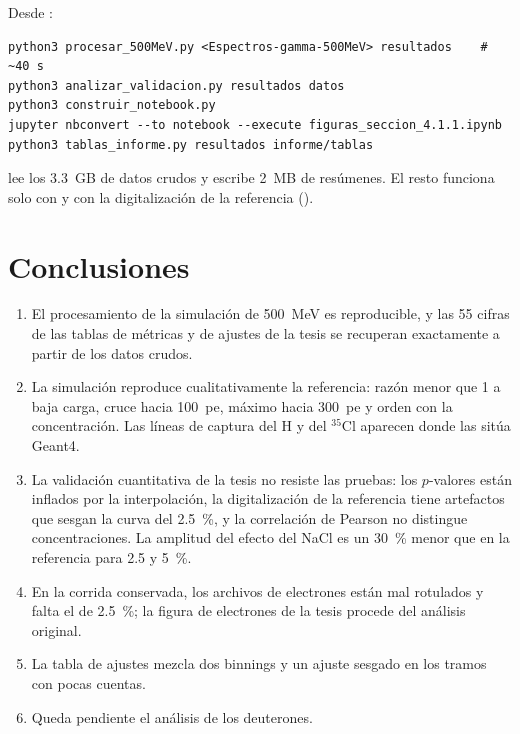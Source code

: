 \documentclass[11pt,a4paper]{article}
\begin{document}
Desde :
\begin{lstlisting}
python3 procesar_500MeV.py <Espectros-gamma-500MeV> resultados    # ~40 s
python3 analizar_validacion.py resultados datos
python3 construir_notebook.py
jupyter nbconvert --to notebook --execute figuras_seccion_4.1.1.ipynb
python3 tablas_informe.py resultados informe/tablas
\end{lstlisting}
 lee los 3.3~GB de datos crudos y escribe 2~MB de resúmenes. El resto funciona solo con  y con la digitalización de la referencia ().

\section{Conclusiones}

\begin{enumerate}
  \item El procesamiento de la simulación de 500~MeV es reproducible, y las 55 cifras de las tablas de métricas y de ajustes de la tesis se recuperan exactamente a partir de los datos crudos.
  \item La simulación reproduce cualitativamente la referencia: razón menor que 1 a baja carga, cruce hacia 100~pe, máximo hacia 300~pe y orden con la concentración. Las líneas de captura del H y del $^{35}$Cl aparecen donde las sitúa Geant4.
  \item La validación cuantitativa de la tesis no resiste las pruebas: los $p$-valores están inflados por la interpolación, la digitalización de la referencia tiene artefactos que sesgan la curva del 2.5~\%, y la correlación de Pearson no distingue concentraciones. La amplitud del efecto del NaCl es un 30~\% menor que en la referencia para 2.5 y 5~\%.
  \item En la corrida conservada, los archivos de electrones están mal rotulados y falta el de 2.5~\%; la figura de electrones de la tesis procede del análisis original.
  \item La tabla de ajustes mezcla dos binnings y un ajuste sesgado en los tramos con pocas cuentas.
  \item Queda pendiente el análisis de los deuterones.
\end{enumerate}
\end{document}
